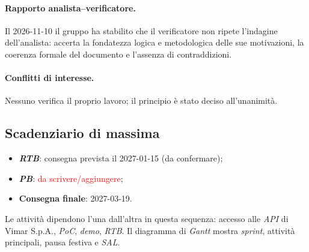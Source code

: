 \documentclass[11pt, a4paper]{article}
\newcommand{\ds}{\textcolor{red}{da scrivere/aggiungere}} %
\begin{document}
	\paragraph{Rapporto analista--verificatore.} Il 2026-11-10 il gruppo ha stabilito che il verificatore non ripete l'indagine dell'analista: accerta la fondatezza logica e metodologica delle sue motivazioni, la coerenza formale del documento e l'assenza di contraddizioni.
	
	\paragraph{Conflitti di interesse.} Nessuno verifica il proprio lavoro; il principio è stato deciso all'unanimità.
	
	\subsection{Scadenziario di massima}
	\begin{itemize}
		\item \textbf{\textit{RTB}}: consegna prevista il 2027-01-15 (da confermare);
		\item \textbf{\textit{PB}}: \ds;
		\item \textbf{Consegna finale}: 2027-03-19.
	\end{itemize}
	Le attività dipendono l'una dall'altra in questa sequenza: accesso alle \textit{API} di Vimar S.p.A., \textit{PoC}, \textit{demo}, \textit{RTB}. Il diagramma di \textit{Gantt} mostra \textit{sprint}, attività principali, pausa festiva e \textit{SAL}.
	
\end{document}
